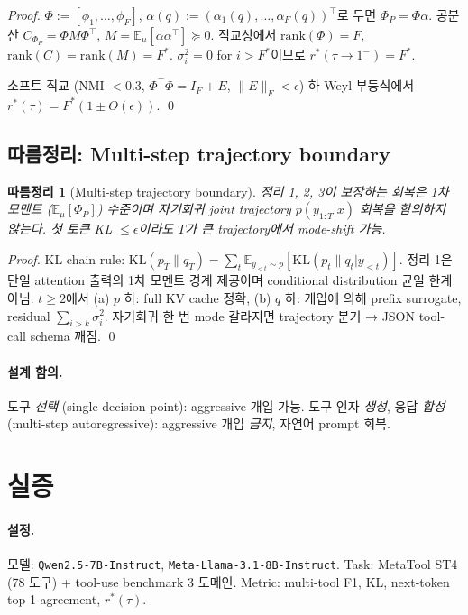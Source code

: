 \documentclass[11pt]{article}
\newtheorem{corollary}{따름정리}
\theoremstyle{definition}
\newcommand{\E}{\mathbb{E}}
\newcommand{\Phip}{\Phi_P}
\begin{document}
\begin{proof}
$\Phi := [\phi_1,\ldots,\phi_F]$, $\alpha(q) := (\alpha_1(q),\ldots,\alpha_F(q))^\top$로 두면 $\Phip = \Phi\alpha$. 공분산 $C_{\Phip} = \Phi M \Phi^\top$, $M = \E_\mu[\alpha\alpha^\top] \succeq 0$. 직교성에서 $\mathrm{rank}(\Phi) = F$, $\mathrm{rank}(C) = \mathrm{rank}(M) = F^*$. $\sigma_i^2 = 0$ for $i > F^*$이므로 $r^*(\tau\to 1^-) = F^*$.

소프트 직교 (NMI $< 0.3$, $\Phi^\top\Phi = I_F + E$, $\|E\|_F < \epsilon$) 하 Weyl 부등식에서 $r^*(\tau) = F^*(1\pm O(\epsilon))$.
\qed
\end{proof}

\subsection{따름정리: Multi-step trajectory boundary}
\label{sec:multistep-bound}

\begin{corollary}[Multi-step trajectory boundary]
\label{cor:multistep}
정리 1, 2, 3이 보장하는 회복은 1차 모멘트 ($\E_\mu[\Phip]$) 수준이며 자기회귀 joint trajectory $p(y_{1:T}|x)$ 회복을 \emph{함의하지 않는다}. 첫 토큰 KL $\le \epsilon$이라도 $T$가 큰 trajectory에서 mode-shift 가능.
\end{corollary}

\begin{proof}
KL chain rule: $\mathrm{KL}(p_T\|q_T) = \sum_t \E_{y_{<t}\sim p}[\mathrm{KL}(p_t\|q_t|y_{<t})]$. 정리 1은 단일 attention 출력의 1차 모멘트 경계 제공이며 conditional distribution 균일 한계 아님. $t\ge 2$에서 (a) $p$ 하: full KV cache 정확, (b) $q$ 하: 개입에 의해 prefix surrogate, residual $\sum_{i>k}\sigma_i^2$. 자기회귀 한 번 mode 갈라지면 trajectory 분기 → JSON tool-call schema 깨짐.
\qed
\end{proof}

\paragraph{설계 함의.}
도구 \emph{선택} (single decision point): aggressive 개입 가능. 도구 인자 \emph{생성}, 응답 \emph{합성} (multi-step autoregressive): aggressive 개입 \emph{금지}, 자연어 prompt 회복.

\section{실증}
\label{sec:experiments}

\paragraph{설정.}
모델: \texttt{Qwen2.5-7B-Instruct}, \texttt{Meta-Llama-3.1-8B-Instruct}. Task: MetaTool ST4 (78 도구) + tool-use benchmark 3 도메인. Metric: multi-tool F1, KL, next-token top-1 agreement, $r^*(\tau)$.
\end{document}
